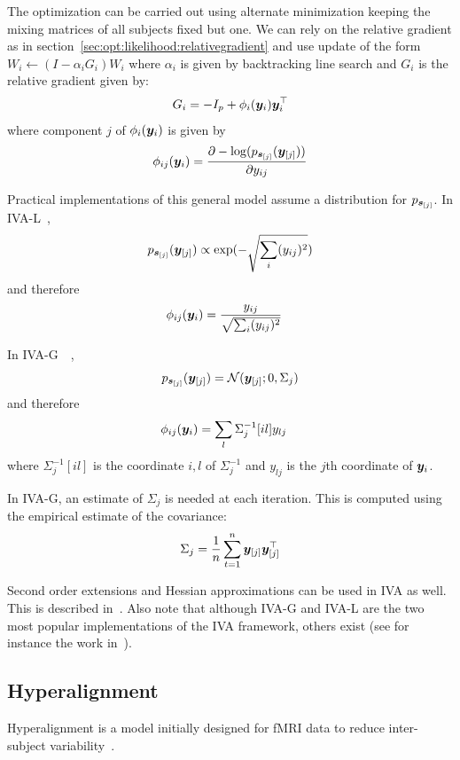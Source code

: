 The optimization can be carried out using alternate minimization keeping the
mixing matrices of all subjects fixed but one. We can rely on the relative
gradient as in section~\ref{sec:opt:likelihood:relativegradient} and use update
of the form $W_i \leftarrow (I - \alpha_i G_i) W_i$ where $\alpha_i$ is given by
backtracking line search and $G_i$ is the relative gradient given by:
\begin{align}
  G_i = -I_p + \phi_i(\yb_i) \yb_i^{\top}
\end{align}
where component $j$ of $\phi_i(\yb_i)$ is given by
\begin{align}
  \phi_{ij}(\yb_i) = \partialfrac{y_{ij}}{-\log(p_{\sbb_{[j]}}(\yb_{[j]}))}
\end{align}

Practical implementations of this general model assume a distribution for
$p_{\sbb_{[j]}}$.
In IVA-L~\cite{lee2008independent},
\begin{align}
  p_{\sbb_{[j]}}(\yb_{[j]}) \propto \exp(-\sqrt{\sum_i (y_{ij})^2})
\end{align}
and therefore
\begin{align}
  \phi_{ij}(\yb_i) &= \frac{y_{ij}}{\sqrt{\sum_i (y_{ij})^2}}
\end{align}

In IVA-G~\cite{anderson2011joint}~\cite{via2011maximum},
\begin{align}
  p_{\sbb_{[j]}}(\yb_{[j]}) = \Ncal( \yb_{[j]}; 0, \Sigma_j)
\end{align}
and therefore
\begin{align}
  \phi_{ij}(\yb_i) &= \sum_l \Sigma_j^{-1}[il] y_{lj}
\end{align}
where  $\Sigma_j^{-1}[il]$ is the coordinate $i, l$ of $\Sigma_j^{-1}$ and
$y_{lj}$ is the $j$th coordinate of $\yb_i$.

In IVA-G, an estimate of $\Sigma_j$ is needed at each iteration. This is
computed using the empirical estimate of the covariance:
\begin{align}
\Sigma_j = \frac1{n} \sum_{t=1}^n \yb_{[j]} \yb_{[j]}^{\top}
\end{align}

Second order extensions and Hessian approximations can be used in IVA as well.
This is described in~\cite{anderson2011joint}. Also note that although IVA-G and
IVA-L are the two most popular implementations of the IVA framework, others exist
(see for instance the work in~\cite{anderson2013independent}).

\subsection{Hyperalignment}
Hyperalignment is a model initially designed for fMRI data to reduce
inter-subject variability~\cite{haxby2011common}.


